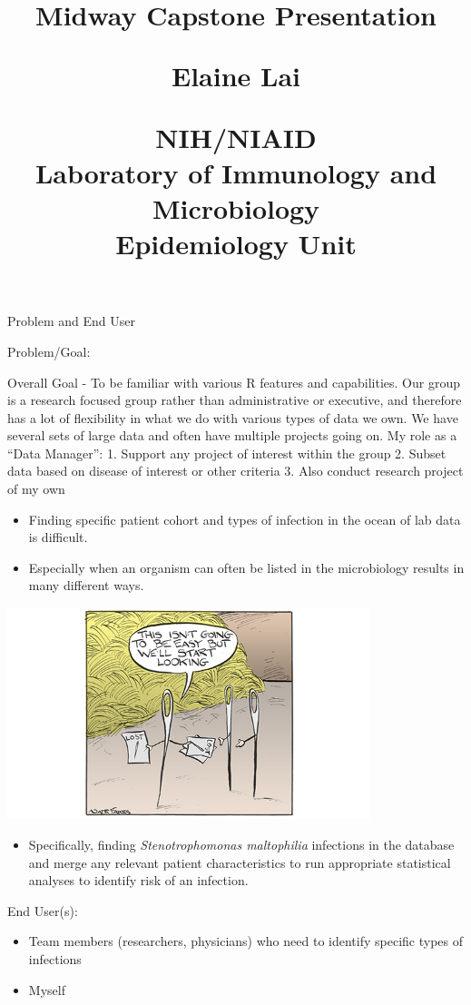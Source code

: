 \documentclass[ignorenonframetext,]{beamer}
\title{Midway Capstone Presentation

Elaine Lai

NIH/NIAID\\
Laboratory of Immunology and Microbiology\\
Epidemiology Unit}
\date{}
\providecommand{\tightlist}{%
  \setlength{\itemsep}{0pt}\setlength{\parskip}{0pt}}
\begin{document}
\frame{\titlepage}

\begin{frame}{Problem and End User}

Problem/Goal:

Overall Goal - To be familiar with various R features and capabilities.
Our group is a research focused group rather than administrative or
executive, and therefore has a lot of flexibility in what we do with
various types of data we own. We have several sets of large data and
often have multiple projects going on. My role as a ``Data Manager'': 1.
Support any project of interest within the group 2. Subset data based on
disease of interest or other criteria 3. Also conduct research project
of my own

\begin{itemize}
\tightlist
\item
  Finding specific patient cohort and types of infection in the ocean of
  lab data is difficult.
\item
  Especially when an organism can often be listed in the microbiology
  results in many different ways.
\end{itemize}

\includegraphics[width=400px]{Cartoon 20171214}

\begin{itemize}
\tightlist
\item
  Specifically, finding \emph{Stenotrophomonas maltophilia} infections
  in the database and merge any relevant patient characteristics to run
  appropriate statistical analyses to identify risk of an infection.
\end{itemize}

End User(s):

\begin{itemize}
\tightlist
\item
  Team members (researchers, physicians) who need to identify specific
  types of infections
\item
  Myself
\end{itemize}

\end{frame}
\end{document}
